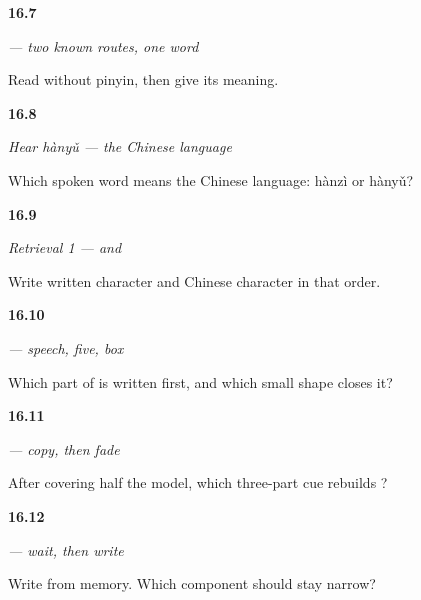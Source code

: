 \noindent\begin{minipage}[t]{\linewidth}
\raggedright
\hypertarget{review-ZH-C16-hanzi-read}{\textbf{16.7}} \emph{ — two known routes, one word}\par
\small Read  without pinyin, then give its meaning.
\end{minipage}\par\medskip

\noindent\begin{minipage}[t]{\linewidth}
\raggedright
\hypertarget{review-ZH-C16-hear-hanyu-meaning}{\textbf{16.8}} \emph{Hear \emph{hànyǔ} — the Chinese language}\par
\small Which spoken word means the Chinese language: hànzì or hànyǔ?
\end{minipage}\par\medskip

\noindent\begin{minipage}[t]{\linewidth}
\raggedright
\hypertarget{review-ZH-R16-identity-1-recall}{\textbf{16.9}} \emph{Retrieval 1 —  and }\par
\small Write written character and Chinese character in that order.
\end{minipage}\par\medskip

\noindent\begin{minipage}[t]{\linewidth}
\raggedright
\hypertarget{review-ZH-W16-yu-observe-order}{\textbf{16.10}} \emph{ — speech, five, box}\par
\small Which part of  is written first, and which small shape closes it?
\end{minipage}\par\medskip

\noindent\begin{minipage}[t]{\linewidth}
\raggedright
\hypertarget{review-ZH-W16-yu-guided-check}{\textbf{16.11}} \emph{ — copy, then fade}\par
\small After covering half the model, which three-part cue rebuilds ?
\end{minipage}\par\medskip

\noindent\begin{minipage}[t]{\linewidth}
\raggedright
\hypertarget{review-ZH-W16-yu-delayed-recall}{\textbf{16.12}} \emph{ — wait, then write}\par
\small Write  from memory. Which component should stay narrow?
\end{minipage}\par\medskip

